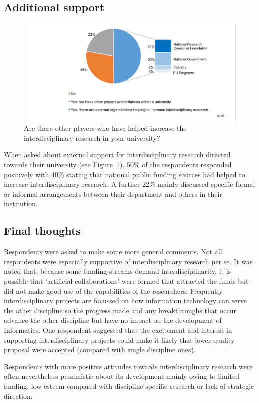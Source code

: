 \subsection {Additional support}

\begin{figure}[h]
\centering
\includegraphics[width = \linewidth]{charts/1d.png}
\caption
{Are there other players who have helped increase the
interdisciplinary research in your university?}
\label{sect1:additional}
\end{figure}

When asked about external support for interdisciplinary research directed towards their university (see Figure~\ref{sect1:additional}), 50\% of the respondents responded positively with 40\% stating that national public funding sources had helped to increase interdisciplinary research. A further 22\% mainly discussed specific formal or informal arrangements between their department and others in their institution.

\subsection{Final thoughts}

Respondents were asked to make some more general comments. Not all respondents were especially supportive of interdisciplinary research per se. It was noted that, because some funding streams demand interdisciplinarity, it is possible that `artificial collaborations' were formed that attracted the funds but did not make good use of the capabilities of the researchers. Frequently interdisciplinary projects are focussed on how information technology can serve the other discipline so the progress made and any breakthroughs that occur advance the other discipline but have no impact on the development of Informatics. One respondent suggested that the excitement and interest in supporting interdisciplinary projects could make it likely that lower quality proposal were accepted (compared with single discipline ones).

Respondents with more positive attitudes towards interdisciplinary research were often nevertheless pessimistic about its development mainly owing to limited funding, low esteem compared with discipline-specific research or lack of strategic direction.

